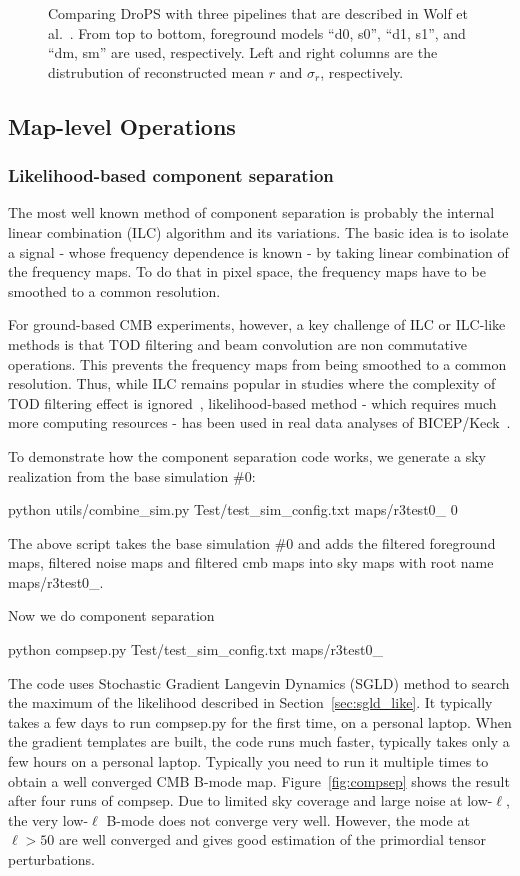 \documentclass[12pt, a4paper]{ctexart} %
\def\tbox#1{\begin{tcolorbox}#1\end{tcolorbox}}
\begin{document}
\begin{figure}
  \caption{Comparing DroPS with three pipelines that are described in Wolf et al.~\cite{SO-SAT}. From top to bottom, foreground models ``d0, s0'', ``d1, s1'', and ``dm, sm'' are used, respectively. Left and right columns are the distrubution of reconstructed mean $r$ and $\sigma_r$, respectively.\label{fig:compare_SO}}
\end{figure}

\subsection{Map-level Operations}

\subsubsection{Likelihood-based component separation}

The most well known method of component separation is probably the internal linear combination (ILC) algorithm and its variations. The basic idea is to isolate a signal - whose frequency dependence is known - by taking linear combination of the frequency maps. To do that in pixel space, the frequency maps have to be smoothed to a common resolution. 

For ground-based CMB experiments, however, a key challenge of ILC or ILC-like methods is that TOD filtering and beam convolution are non commutative operations. This prevents the frequency maps from being smoothed to a common resolution. Thus, while ILC remains popular in studies where the complexity of TOD filtering effect is ignored~\cite{SO-SAT}, likelihood-based method - which requires much more computing resources - has been used in real data analyses of BICEP/Keck~\cite{BKmap}.

To demonstrate how the component separation code works, we generate a sky realization from the base simulation \#0:
\tbox{python utils/combine\_sim.py Test/test\_sim\_config.txt maps/r3test0\_  0}
The above script takes the base simulation \#0 and adds the filtered foreground maps, filtered noise maps and filtered cmb maps into sky maps with root name maps/r3test0\_.

Now we do component separation
\tbox{python compsep.py Test/test\_sim\_config.txt maps/r3test0\_}

The code uses Stochastic Gradient Langevin Dynamics (SGLD) method to search the maximum of the likelihood described in Section~\ref{sec:sgld_like}. It typically takes a few days to run compsep.py for the first time, on a personal laptop. When the gradient templates are built, the code runs much faster, typically takes only a few hours on a personal laptop. Typically you need to run it multiple times to obtain a well converged CMB B-mode map. Figure~\ref{fig:compsep} shows the result after four runs of compsep. Due to limited sky coverage and large noise at low-$\ell$, the very low-$\ell$ B-mode does not converge very well. However, the mode at $\ell >50$ are well converged and gives good estimation of the primordial tensor perturbations.
\end{document}
